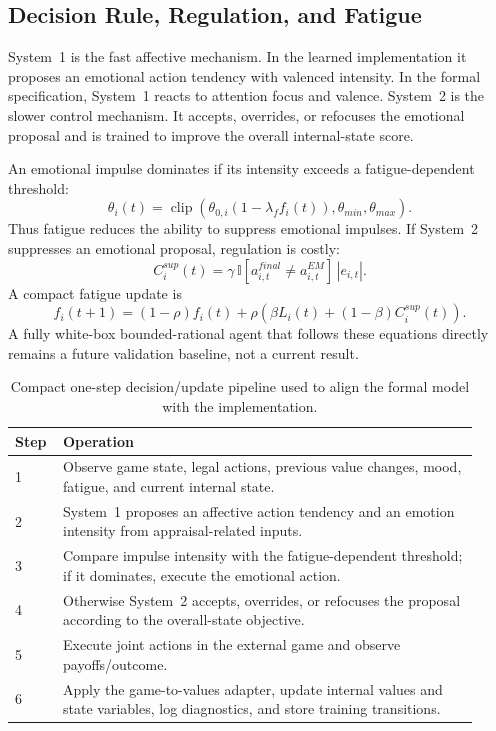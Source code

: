 \documentclass[runningheads]{llncs}
\newcommand{\ind}{\mathbb{I}}
\newcommand{\clip}{\operatorname{clip}}
\begin{document}
\subsection{Decision Rule, Regulation, and Fatigue}

System~1 is the fast affective mechanism. In the learned implementation it proposes an emotional action tendency with valenced intensity. In the formal specification, System~1 reacts to attention focus and valence. System~2 is the slower control mechanism. It accepts, overrides, or refocuses the emotional proposal and is trained to improve the overall internal-state score.

An emotional impulse dominates if its intensity exceeds a fatigue-dependent threshold:
\[
\theta_i(t)=\clip\left(\theta_{0,i}(1-\lambda_f f_i(t)),\theta_{min},\theta_{max}\right).
\]
Thus fatigue reduces the ability to suppress emotional impulses. If System~2 suppresses an emotional proposal, regulation is costly:
\[
C^{sup}_i(t)=\gamma\,\ind[a^{final}_{i,t}\neq a^{EM}_{i,t}]\,|e_{i,t}|.
\]
A compact fatigue update is
\[
f_i(t+1)=(1-\rho)f_i(t)+\rho\left(\beta L_i(t)+(1-\beta)C^{sup}_i(t)\right).
\]
A fully white-box bounded-rational agent that follows these equations directly remains a future validation baseline, not a current result.


\begin{table}[t]
\centering
\caption{Compact one-step decision/update pipeline used to align the formal model with the implementation.}
\label{tab:pipeline}
\scriptsize
\begin{tabular}{p{0.08\linewidth}p{0.84\linewidth}}
\toprule
Step & Operation \\
\midrule
1 & Observe game state, legal actions, previous value changes, mood, fatigue, and current internal state. \\
2 & System~1 proposes an affective action tendency and an emotion intensity from appraisal-related inputs. \\
3 & Compare impulse intensity with the fatigue-dependent threshold; if it dominates, execute the emotional action. \\
4 & Otherwise System~2 accepts, overrides, or refocuses the proposal according to the overall-state objective. \\
5 & Execute joint actions in the external game and observe payoffs/outcome. \\
6 & Apply the game-to-values adapter, update internal values and state variables, log diagnostics, and store training transitions. \\
\bottomrule
\end{tabular}
\end{table}
\end{document}
